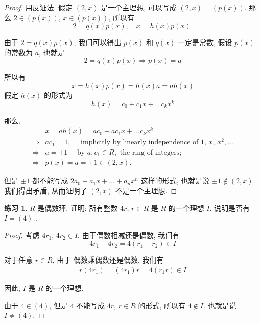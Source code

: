 \documentclass[utf8]{ctexbook}
\theoremstyle{definition}
\newtheorem{exercise}{练习}[section]
\begin{document}
\begin{proof}
用反证法. 假定 $(2, x)$ 是一个主理想, 可以写成 $(2, x) = (p(x))$. 那么 $2 \in (p(x))$, $x \in (p(x))$, 所以有
\begin{equation}
2 = q(x) p(x), \quad x = h(x) p(x).  \nonumber
\end{equation} 

由于 $2 = q(x) p(x)$, 我们可以得出 $p(x)$ 和 $q(x)$ 一定是常数, 假设 $p(x)$ 的常数为 $a$, 也就是
\begin{equation}
2 = q(x) p(x) \Longrightarrow p(x) = a   \nonumber
\end{equation} 

所以有
\begin{equation}
x = h(x) p(x) = h(x) a = a h(x) \nonumber
\end{equation}
假定 $h(x)$ 的形式为
\begin{equation}
h(x) = c_0 + c_1 x + \ldots c_k x^k \nonumber
\end{equation}

那么,
\begin{align*}
& x = a h(x) = a c_0 + a c_1 x + \ldots c_k x^k  \\
\Longrightarrow & a c_1 = 1, \quad   \mbox{ implicitly by linearly independence of } 1, \, x, \, x^2 , \ldots \\
\Longrightarrow & a = \pm 1  \quad \mbox{ by } a, c_1  \in R, \mbox{ the ring of integers};  \\
\Longrightarrow & p(x) = a = \pm 1 \in (2, x) .
\end{align*}

但是 $\pm 1$ 都不能写成 $2 a_0 + a_1 x + \ldots + a_n x^n$ 这样的形式, 也就是说 $\pm 1 \not \in (2, x)$. 我们得出矛盾, 从而证明了 $(2, x)$ 不是一个主理想.
\end{proof}

\begin{exercise}
$R$ 是偶数环. 证明: 所有整数 $4r$, $r \in R$ 是 $R$ 的一个理想 $I$. 说明是否有 $I = (4)$ .
\end{exercise}

\begin{proof}
考虑 $4 r_1$, $4 r_2 \in I$. 由于偶数相减还是偶数, 我们有
\begin{equation}
4 r_1 - 4 r_2 = 4(r_1 - r_2) \in I \nonumber
\end{equation}

对于任意 $r \in R$, 由于 偶数乘偶数还是偶数, 我们有
\begin{align*}
r( 4 r_1) = (4 r_1) r = 4 (r_1 r) \in I
\end{align*}

因此, $I$ 是 $R$ 的一个理想.

由于 $4 \in (4)$, 但是 $4$ 不能写成 $4r$, $r \in R$ 的形式, 所以有 $4 \not \in I$. 也就是说 $I \neq (4)$.

\end{proof}
\end{document}
